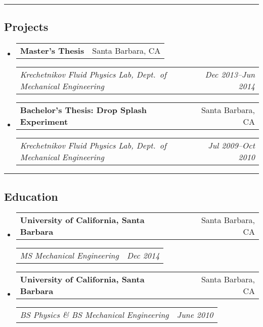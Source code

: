 \documentclass[10pt,letterpaper]{article}
\makeatletter
\newcommand{\headerrow}[2]{
\begin{tabular*}{\linewidth}{l@{\extracolsep{\fill}}r}
		#1 &
		#2 \\
	\end{tabular*}
}
\newcommand{\jobitem}[4]{\item \headerrow{\textbf{#1}}{#2}
\headerrow{\emph{#3}}{\emph{#4}}}
\makeatother
\begin{document}
\hrule
\subsection*{Projects}
\begin{itemize}
	\jobitem{Master's Thesis}{Santa Barbara, CA}
		    {Krechetnikov Fluid Physics Lab, Dept.~of Mechanical Engineering}{Dec 2013--Jun 2014}
	
	\jobitem{Bachelor's Thesis: Drop Splash Experiment}{Santa Barbara, CA}
		    {Krechetnikov Fluid Physics Lab, Dept.~of Mechanical Engineering}{Jul 2009--Oct 2010}
	
\end{itemize}

\hrule
\subsection*{Education}
\begin{itemize}
	\jobitem{University of California, Santa Barbara}{Santa Barbara, CA}
		    {MS  Mechanical Engineering}{Dec 2014}
	\jobitem{University of California, Santa Barbara}{Santa Barbara, CA}	
		    {BS Physics \&  BS Mechanical Engineering}{June 2010}
\end{itemize}
\end{document}

